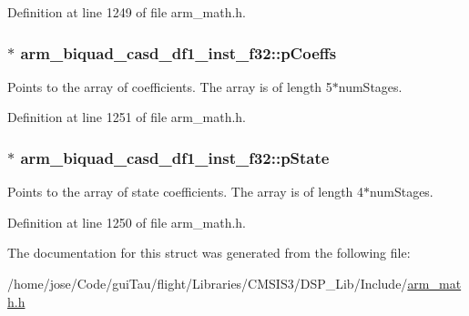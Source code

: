 Definition at line 1249 of file arm\-\_\-math.\-h.

\hypertarget{structarm__biquad__casd__df1__inst__f32_af9df3820576fb921809d1462c9c6d16c}{
\subsubsection[{p\-Coeffs}]{$\ast$ arm\-\_\-biquad\-\_\-casd\-\_\-df1\-\_\-inst\-\_\-f32\-::p\-Coeffs}}\label{structarm__biquad__casd__df1__inst__f32_af9df3820576fb921809d1462c9c6d16c}
Points to the array of coefficients. The array is of length 5$\ast$num\-Stages. 

Definition at line 1251 of file arm\-\_\-math.\-h.

\hypertarget{structarm__biquad__casd__df1__inst__f32_a8c245d79e0d8cfabc82409d4b54fb682}{
\subsubsection[{p\-State}]{$\ast$ arm\-\_\-biquad\-\_\-casd\-\_\-df1\-\_\-inst\-\_\-f32\-::p\-State}}\label{structarm__biquad__casd__df1__inst__f32_a8c245d79e0d8cfabc82409d4b54fb682}
Points to the array of state coefficients. The array is of length 4$\ast$num\-Stages. 

Definition at line 1250 of file arm\-\_\-math.\-h.



The documentation for this struct was generated from the following file\-:\begin{DoxyCompactItemize}
\item 
/home/jose/\-Code/gui\-Tau/flight/\-Libraries/\-C\-M\-S\-I\-S3/\-D\-S\-P\-\_\-\-Lib/\-Include/\hyperlink{arm__math_8h}{arm\-\_\-math.\-h}\end{DoxyCompactItemize}
